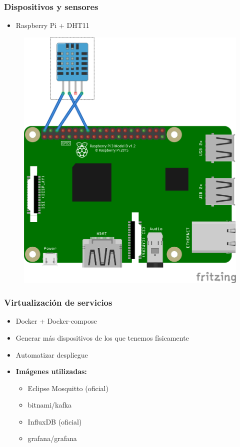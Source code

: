 \documentclass[12pt]{beamer}
\begin{document}
        \begin{frame}
            \frametitle{Dispositivos y sensores}

            \begin{itemize}
                \item Raspberry Pi + DHT11
            \end{itemize}

            \begin{figure}[]
                \centering
                \includegraphics[height=0.6\paperheight]{schema}
            \end{figure}
        \end{frame}

        \begin{frame}
            \frametitle{Virtualización de servicios}

            \begin{itemize}
                \item Docker + Docker-compose
                \item Generar más dispositivos de los que tenemos físicamente
                \item Automatizar despliegue
                \item \textbf{Imágenes utilizadas:}
                \begin{itemize}
                    \item Eclipse Mosquitto (oficial)
                    \item bitnami/kafka
                    \item InfluxDB (oficial)
                    \item grafana/grafana
                \end{itemize}
            \end{itemize}
        \end{frame}
\end{document}
